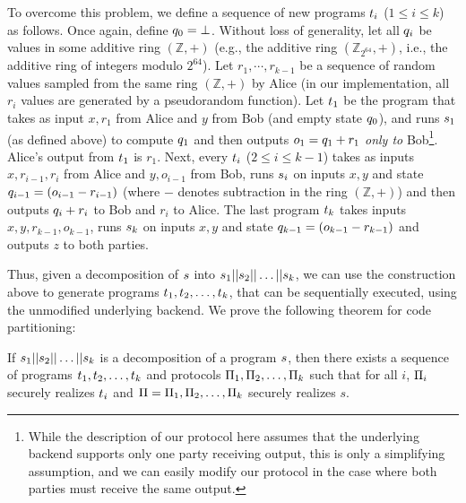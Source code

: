 To overcome this problem, we define a sequence of new programs
$t_i$ ($1\leq i\leq k$) as follows. Once again, define $q_0
= \bot$. Without
loss of generality, let all $q_i$ be values in some additive ring
$(\mathbb{Z},+)$ (e.g., the additive ring $(\mathbb{Z}_{2^{64}},+)$,
i.e., the additive ring of integers modulo $2^{64}$).
Let $r_1,\cdots,r_{k-1}$ be a sequence of random values sampled from
the same ring $(\mathbb{Z},+)$ by Alice (in our implementation, all
$r_i$ values are generated by a pseudorandom function). Let $t_1$
be the program that takes as input $x,r_1$ from Alice and $y$ from Bob
(and empty state $q_0$), and runs $s_1$ (as defined above) to
compute $q_1$ and then outputs $o_1 = q_1 + r_1$ {\em only
  to} Bob\footnote{While the description of our protocol here assumes
  that
  the underlying backend supports only one party receiving output,
  this is only a simplifying assumption, and we can easily modify our
  protocol in the case where both parties must receive the same
  output. %
  }. 
  Alice's output
from $t_1$ is $r_1$. Next, every $t_i$ ($2\leq i\leq k-1$)
takes as inputs $x,r_{i-1},r_i$ from Alice and $y,o_{i-1}$ from Bob,
runs $s_i$
on inputs $x,y$ and state $q_{i-1} = (o_{i-1}-r_{i-1})$ (where $-$ denotes
subtraction in the ring $(\mathbb{Z},+)$) and then outputs $q_i+r_i$
to Bob and $r_i$ to Alice. The last
program $t_k$ takes inputs $x,y,r_{k-1},o_{k-1}$, runs $s_k$
on inputs $x,y$ and state $q_{k-1} = (o_{k-1}-r_{k-1})$ and outputs $z$ to both
parties.

Thus, given a decomposition of $s$ into
$s_1||s_2||\dots||s_k$, we can use the construction
above to generate programs $t_1,t_2,\ldots,t_k$, that
can be sequentially executed, using the unmodified underlying \mpc
backend. We prove the following theorem for code partitioning:


\begin{theorem}
If $s_1||s_2||\ldots||s_k$ is a decomposition of a program $s$, then there exists a sequence of programs $t_1, t_2, \ldots, t_k$ and protocols $\Pi_1, \Pi_2, \ldots, \Pi_k$ such that for all $i$, $\Pi_i$ securely realizes $t_i$ and  $\Pi
= \Pi_1,\Pi_2,\dots,\Pi_k$ securely realizes $s$.
\end{theorem}

